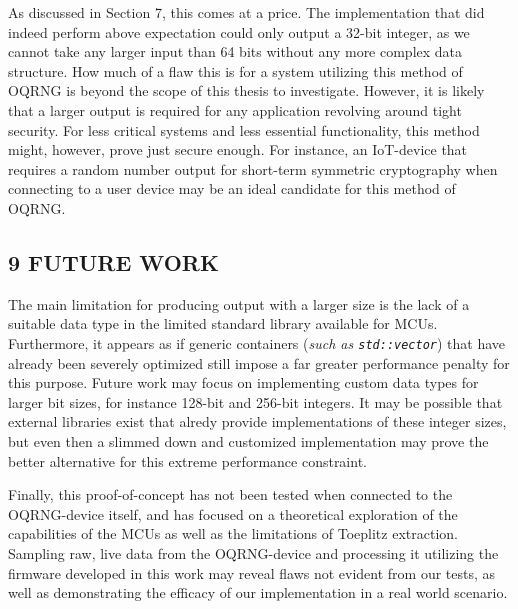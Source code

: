 As discussed in Section 7, this comes at a price. The implementation that did indeed perform above expectation could only output a 32-bit integer, as we cannot take any larger input than 64 bits without any more complex data structure. How much of a flaw this is for a system utilizing this method of OQRNG is beyond the scope of this thesis to investigate. However, it is likely that a larger output is required for any application revolving around tight security. For less critical systems and less essential functionality, this method might, however, prove just secure enough. For instance, an IoT-device that requires a random number output for short-term symmetric cryptography when connecting to a user device may be an ideal candidate for this method of OQRNG.

\subsection{9 FUTURE WORK}\label{future-work}

The main limitation for producing output with a larger size is the lack of a suitable data type in the limited standard library available for MCUs. Furthermore, it appears as if generic containers (\emph{such as \texttt{std::vector}}) that have already been severely optimized still impose a far greater performance penalty for this purpose. Future work may focus on implementing custom data types for larger bit sizes, for instance 128-bit and 256-bit integers. It may be possible that external libraries exist that alredy provide implementations of these integer sizes, but even then a slimmed down and customized implementation may prove the better alternative for this extreme performance constraint.

Finally, this proof-of-concept has not been tested when connected to the OQRNG-device itself, and has focused on a theoretical exploration of the capabilities of the MCUs as well as the limitations of Toeplitz extraction. Sampling raw, live data from the OQRNG-device and processing it utilizing the firmware developed in this work may reveal flaws not evident from our tests, as well as demonstrating the efficacy of our implementation in a real world scenario.
